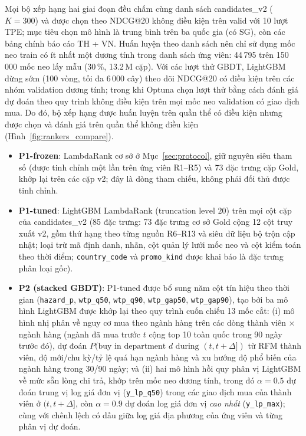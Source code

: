 \documentclass[jtehm]{ieeeaccess}
\newcommand{\nK}{300}                %
\begin{document}
Mọi bộ xếp hạng hai giai đoạn đều chấm cùng danh sách candidates\_v2 ($K = \nK{}$) và được chọn theo NDCG@20 không điều kiện trên valid với 10 lượt TPE; mục tiêu chọn mô hình là trung bình trên ba quốc gia (có SG), còn các bảng chính báo cáo TH + VN. Huấn luyện theo danh sách nên chỉ sử dụng mốc neo train có ít nhất một dương tính trong danh sách ứng viên: 44\,795 trên 150\,000 mốc neo lấy mẫu (30\,\%, 13.2\,M cặp). Với các lượt thử GBDT, LightGBM dừng sớm (100 vòng, tối đa 6\,000 cây) theo dõi NDCG@20 có điều kiện trên các nhóm validation dương tính; trong khi Optuna chọn lượt thử bằng cách đánh giá dự đoán theo quy trình không điều kiện trên mọi mốc neo validation có giao dịch mua. Do đó, bộ xếp hạng được huấn luyện trên quần thể có điều kiện nhưng được chọn và đánh giá trên quần thể không điều kiện (Hình~\ref{fig:rankers_compare}).
\begin{itemize}
\item \textbf{P1-frozen}: LambdaRank cơ sở ở Mục~\ref{sec:protocol}, giữ nguyên siêu tham số (được tinh chỉnh một lần trên ứng viên R1--R5) và 73 đặc trưng cặp Gold, khớp lại trên các cặp v2; đây là dòng tham chiếu, không phải đối thủ được tinh chỉnh.
\item \textbf{P1-tuned}: LightGBM LambdaRank ($\text{truncation level } 20$) trên mọi cột cặp của candidates\_v2 (85 đặc trưng: 73 đặc trưng cơ sở Gold cộng 12 cột truy xuất v2, gồm thứ hạng theo từng nguồn R6--R13 và siêu dữ liệu bộ trộn cập nhật; loại trừ mã định danh, nhãn, cột quản lý lưới mốc neo và cột kiểm toán theo thời điểm; \texttt{country\_code} và \texttt{promo\_kind} được khai báo là đặc trưng phân loại gốc).
\item \textbf{P2 (stacked GBDT)}: P1-tuned được bổ sung năm cột tín hiệu theo thời gian (\texttt{hazard\_p}, \texttt{wtp\_q50}, \texttt{wtp\_q90}, \texttt{wtp\_gap50}, \texttt{wtp\_gap90}), tạo bởi ba mô hình LightGBM được khớp lại theo quy trình cuốn chiếu 13 mốc cắt: (i) mô hình nhị phân về nguy cơ mua theo ngành hàng trên các dòng thành viên $\times$ ngành hàng (ngành đã mua trước $t$ cộng top 10 toàn quốc trong 90 ngày trước đó), dự đoán $P(\text{buy in department } d \text{ during } (t, t+\Delta])$ từ RFM thành viên, độ mới/chu kỳ/tỷ lệ quá hạn ngành hàng và xu hướng độ phổ biến của ngành hàng trong 30/90 ngày; và (ii) hai mô hình hồi quy phân vị LightGBM về mức sẵn lòng chi trả, khớp trên mốc neo dương tính, trong đó $\alpha = 0.5$ dự đoán trung vị log giá đơn vị (\texttt{y\_lp\_q50}) trong các giao dịch mua của thành viên ở $(t, t+\Delta]$, còn $\alpha = 0.9$ dự đoán log giá đơn vị \emph{cao nhất} (\texttt{y\_lp\_max}); cùng với chênh lệch có dấu giữa log giá địa phương của ứng viên và từng phân vị dự đoán.

\end{itemize}
\end{document}
